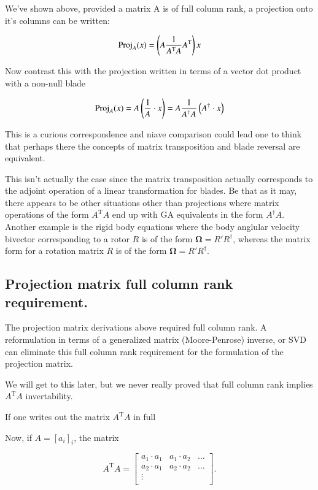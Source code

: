 \documentclass{article}      %
\newcommand{\T}[0]{\text{T}}
\newcommand{\BOmega}[0]{\boldsymbol{\Omega}}
\begin{document}
We've shown above, provided a matrix A is of full column rank, a projection onto it's columns can be written:

\[
\Proj_A(x) = \left( A \frac{1}{A^\T A} A^\T \right) x
\]

Now contrast this with the projection written in terms of a vector dot product with a non-null blade 

\[
\operatorname{Proj}_A(x) = A \left(\frac{1}{A} \cdot x\right) = A \frac{1}{A^\dagger A} \left(A^\dagger \cdot x\right)
\]

This is a curious correspondence and niave comparison could lead one to think that perhaps there the concepts of matrix
transposition and blade reversal are equivalent.

This isn't actually the case since the matrix transposition actually corresponds to
the adjoint operation of a linear transformation for blades.  Be that as it may, there appears to be other situations
other than projections where matrix operations of the form $A^\T A$ end up with GA equivalents in the form $A^\dagger A$.  Another example
is the rigid body equations where the body anglular velocity bivector corresponding to a rotor $R$ is of the form $\BOmega = R' R^\dagger$, whereas the matrix
form for a rotation matrix $R$ is of the form $\BOmega = R' R^\dagger$.

\subsection{ Projection matrix full column rank requirement. }

The projection matrix derivations above required full column rank.  A reformulation in terms
of a generalized matrix (Moore-Penrose) inverse, or SVD can eliminate this full column rank requirement for
the formulation of the projection matrix.

We will get to this later, but we never really proved that
full column rank implies $A^\T A$ invertability.

If one writes out the matrix $A^\T A$ in full

Now, if $A = [a_i]_i$, the matrix

\begin{equation}\label{eqn:AtA}
A^\T A
=
\begin{bmatrix}
{a_1} \cdot {a_1} & {a_1} \cdot {a_2} & \hdots \\
{a_2} \cdot {a_1} & {a_2} \cdot {a_2} & \hdots \\
\vdots & & \\
\end{bmatrix}.
\end{equation}
\end{document}
